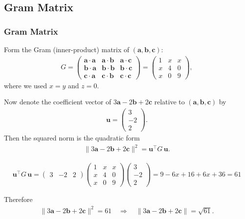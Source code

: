 \documentclass{beamer}
\theoremstyle{remark}
\newcommand{\myvec}[1]{\ensuremath{\begin{pmatrix}#1\end{pmatrix}}}
\let\vec\mathbf
\numberwithin{equation}{section}
\begin{document}
\subsection{Gram Matrix}
\begin{frame}
\frametitle{Gram Matrix}
Form the Gram (inner-product) matrix of $(\vec a,\vec b,\vec c)$:
\begin{align}
G=\myvec
{\vec a\cdot\vec a & \vec a\cdot\vec b & \vec a\cdot\vec c\\
\vec b\cdot\vec a & \vec b\cdot\vec b & \vec b\cdot\vec c\\
\vec c\cdot\vec a & \vec c\cdot\vec b & \vec c\cdot\vec c}
=
\myvec
{1 & x & x\\
x & 4 & 0\\
x & 0 & 9}
,
\end{align}
where we used $x=y$ and $z=0$.

Now denote the coefficient vector of $3\vec a-2\vec b+2\vec c$ relative to $(\vec a,\vec b,\vec c)$ by
\begin{align}
\mathbf{u}=\myvec{3\\-2\\2}.
\end{align}
Then the squared norm is the quadratic form
\begin{align}
\bigl\lVert 3\vec a-2\vec b+2\vec c\bigr\rVert^2
= \mathbf{u}^\top G\,\mathbf{u}.
\end{align}
\end{frame}

\begin{frame}
\begin{align}
\mathbf{u}^\top G\, \mathbf{u}
=\myvec
{3 & -2 & 2}
\myvec
{1 & x & x\\
x & 4 & 0\\
x & 0 & 9}
\myvec 
{3\\-2\\2 }
=9 -6x +16 +6x +36 =61
\end{align}

Therefore
\begin{align}
\bigl\lVert 3\vec a-2\vec b+2\vec c\bigr\rVert^2 = 61
\quad\Longrightarrow\quad
\boxed{\bigl\lVert 3\vec a-2\vec b+2\vec c\bigr\rVert=\sqrt{61}}.
\end{align}
\end{frame}
\end{document}

